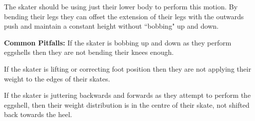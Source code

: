 The skater should be using just their lower body to perform this motion.
By bending their legs they can offset the extension of their legs with the outwards push and maintain a constant height without ``bobbing" up and down. 

{\bf Common Pitfalls: }
If the skater is bobbing up and down as they perform eggshells then they are not bending their knees enough. 

If the skater is lifting or correcting foot position then they are not applying their weight to the edges of their skates.  


If the skater is juttering backwards and forwards as they attempt to perform the eggshell, then their weight distribution is in the centre of their skate, not shifted back towards the heel.   




